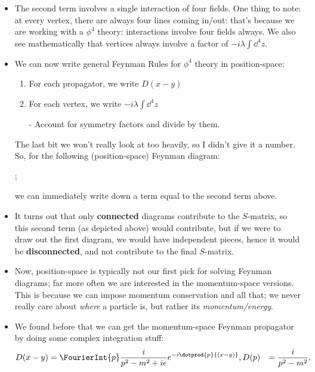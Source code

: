 \begin{itemize}
    \item The second term involves a single interaction of four fields. One thing to note: at every vertex, there are always four lines coming in/out: that's because we are working with a $\phi^4$ theory: interactions involve four fields always. We also see mathematically that vertices always involve a factor of $-i\lambda\int\dd^4z$.
    \item We can now write general Feynman Rules for $\phi^4$ theory in position-space:
        \begin{enumerate}
            \item For each propagator, we write $D(x-y)$
            \item For each vertex, we write $-i\lambda\int\dd^4z$
            \item[-] Account for symmetry factors and divide by them. 
        \end{enumerate}
            The last bit we won't really look at too heavily, so I didn't give it a number.
        So, for the following (position-space) Feynman diagram:
        \begin{center}
        ;
        \end{center}
        we can immediately write down a term equal to the second term above.
    \item It turns out that only \textbf{connected} diagrams contribute to the $S$-matrix, so this second term (as depicted above) would contribute, but if we were to draw out the first diagram, we would have independent pieces, hence it would be \textbf{disconnected}, and not contribute to the final $S$-matrix.
    \item Now, position-space is typically not our first pick for solving Feynman diagrams; far more often we are interested in the momentum-space versions. This is because we can impose momentum conservation and all that; we never really care about \textit{where} a particle is, but rather its \textit{momentum/energy}.
    \item We found before that we can get the momentum-space Feynman propagator by doing some complex integration stuff:
        \begin{align*}
            D(x-y) &= \FourierInt{p} \frac{i}{p^2-m^2 + i\epsilon}e^{-i\dotprod{p}{(x-y)}},
            D(p) &= \frac{i}{p^2-m^2},
        \end{align*}

\end{itemize}
